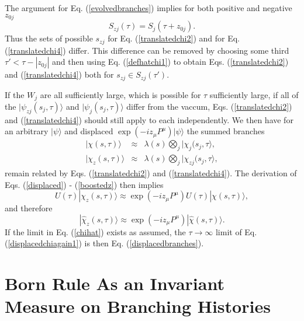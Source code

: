 \documentclass[twocolumn,amsmath,amssymb]{revtex4-1}
\begin{document}
The argument for Eq. (\ref{evolvedbranches})
implies for both positive and negative $z_{0j}$
\begin{equation}
  \label{translatedbraches}
  S_{zj}( \tau) = S_j( \tau + z_{0j}).
\end{equation}
Thus the sets of possible $s_{zj}$ for Eq. (\ref{translatedchi2}) and
for Eq. (\ref{translatedchi4}) differ. This difference can be
removed by choosing some third $\tau' < \tau - |z_{0j}|$ and then
using Eq. (\ref{defhatchi1}) to obtain Eqs. (\ref{translatedchi2}) and (\ref{translatedchi4})
both for $s_{zj} \in S_{zj}( \tau')$.


If the $W_j$ are all sufficiently large, which is possible for $\tau$ sufficiently large,
if all of the $|\psi_{zj}( s_j, \tau) \rangle $ and $|\psi_j( s_j, \tau) \rangle $ differ from
the vaccum, 
Eqs. (\ref{translatedchi2}) and (\ref{translatedchi4}) should still apply to each
independently.  We then have for an arbitrary $|\psi \rangle $ and  displaced
$\exp( -i  z_\mu P^\mu ) |\psi \rangle $ the summed branches
\begin{subequations}
  \begin{eqnarray}
    \label{chiprod}
    |\chi( s, \tau) \rangle  & \approx & \lambda( s) \bigotimes_j |\chi_j( s_j, \tau \rangle , \\
    \label{chiprodz}
    |\chi_z( s, \tau) \rangle  & \approx & \lambda( s) \bigotimes_j |\chi_{zj}( s_j, \tau \rangle ,
  \end{eqnarray}
\end{subequations}
remain related by Eqs. (\ref{translatedchi2}) and (\ref{translatedchi4}).
The derivation of Eqs. (\ref{displaced}) - (\ref{boostedz}) then implies
\begin{equation}
  \label{displacedchiagain}
  U( \tau) |\chi_z( s, \tau) \rangle  \approx \exp( -iz_\mu P^\mu) U( \tau) |\chi( s, \tau) \rangle ,
\end{equation}
and therefore 
\begin{equation}
  \label{displacedchiagain1}
  |\hat{\chi}_z( s, \tau) \rangle  \approx \exp( -iz_\mu P^\mu) |\hat{\chi}( s, \tau) \rangle .
\end{equation}
If the limit in Eq. (\ref{chihat}) exists as assumed, 
the $\tau \rightarrow \infty$ limit of Eq. (\ref{displacedchiagain1}) is then
Eq. (\ref{displacedbranches}).


\section{\label{sec:bornrule} Born Rule As an Invariant Measure on Branching Histories}
\end{document}
